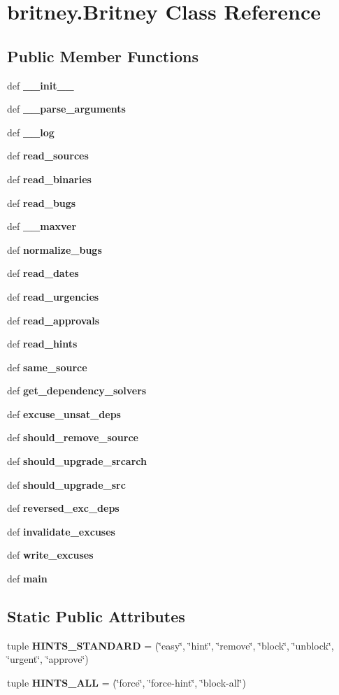 \section{britney.Britney Class Reference}
\label{classbritney_1_1Britney}
\subsection*{Public Member Functions}
\begin{CompactItemize}
\item 
def {\bf \_\-\_\-init\_\-\_\-}
\item 
def {\bf \_\-\_\-parse\_\-arguments}
\item 
def {\bf \_\-\_\-log}
\item 
def {\bf read\_\-sources}
\item 
def {\bf read\_\-binaries}
\item 
def {\bf read\_\-bugs}
\item 
def {\bf \_\-\_\-maxver}
\item 
def {\bf normalize\_\-bugs}
\item 
def {\bf read\_\-dates}
\item 
def {\bf read\_\-urgencies}
\item 
def {\bf read\_\-approvals}
\item 
def {\bf read\_\-hints}
\item 
def {\bf same\_\-source}
\item 
def {\bf get\_\-dependency\_\-solvers}
\item 
def {\bf excuse\_\-unsat\_\-deps}
\item 
def {\bf should\_\-remove\_\-source}
\item 
def {\bf should\_\-upgrade\_\-srcarch}
\item 
def {\bf should\_\-upgrade\_\-src}
\item 
def {\bf reversed\_\-exc\_\-deps}
\item 
def {\bf invalidate\_\-excuses}
\item 
def {\bf write\_\-excuses}
\item 
def {\bf main}
\end{CompactItemize}
\subsection*{Static Public Attributes}
\begin{CompactItemize}
\item 
tuple {\bf HINTS\_\-STANDARD} = (\char`\"{}easy\char`\"{}, \char`\"{}hint\char`\"{}, \char`\"{}remove\char`\"{}, \char`\"{}block\char`\"{}, \char`\"{}unblock\char`\"{}, \char`\"{}urgent\char`\"{}, \char`\"{}approve\char`\"{})\label{classbritney_1_1Britney_ebbe3f40cca59e2de275b0558556ee63}

\item 
tuple {\bf HINTS\_\-ALL} = (\char`\"{}force\char`\"{}, \char`\"{}force-hint\char`\"{}, \char`\"{}block-all\char`\"{})\label{classbritney_1_1Britney_a088d6fd96963f87f88c9c40cda10bfa}

\end{CompactItemize}


